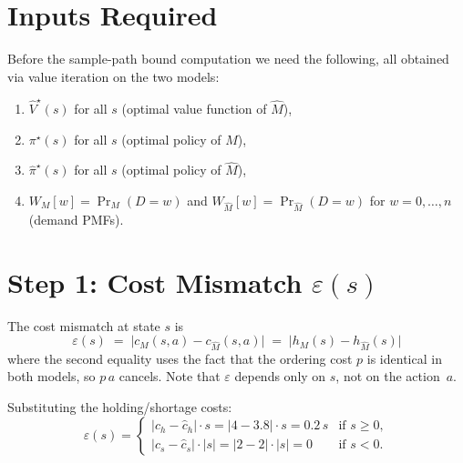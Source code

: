 \documentclass[11pt]{article}
\newcommand{\pistar}{\pi^\star}
\newcommand{\pihatstar}{\hat\pi^\star}
\newcommand{\Vhatstar}{\hat V^\star}
\begin{document}
\section{Inputs Required}

Before the sample-path bound computation we need the following, all obtained
via value iteration on the two models:
%
\begin{enumerate}
  \item $\Vhatstar(s)$ for all $s$ \quad (optimal value function of $\hat M$),
  \item $\pistar(s)$ for all $s$ \quad (optimal policy of $M$),
  \item $\pihatstar(s)$ for all $s$ \quad (optimal policy of $\hat M$),
  \item $W_M[w] = \Pr_M(D = w)$ and $W_{\hat M}[w] = \Pr_{\hat M}(D = w)$
        for $w = 0, \ldots, n$ \quad (demand PMFs).
\end{enumerate}

\section{Step 1: Cost Mismatch $\varepsilon(s)$}

The cost mismatch at state $s$ is
\begin{equation}\label{eq:epsilon}
  \varepsilon(s)
  \;=\; \bigl|c_M(s, a) - c_{\hat M}(s, a)\bigr|
  \;=\; \bigl|h_M(s) - h_{\hat M}(s)\bigr|
\end{equation}
where the second equality uses the fact that the ordering cost $p$ is identical
in both models, so $p\,a$ cancels.  Note that $\varepsilon$ depends only on
$s$, not on the action~$a$.

Substituting the holding/shortage costs:
\begin{equation}\label{eq:epsilon-explicit}
  \varepsilon(s) =
  \begin{cases}
    |c_h - \hat c_h| \cdot s = |4 - 3.8| \cdot s = 0.2\,s
      & \text{if } s \ge 0, \\[4pt]
    |c_s - \hat c_s| \cdot |s| = |2 - 2| \cdot |s| = 0
      & \text{if } s < 0.
  \end{cases}
\end{equation}
\end{document}
